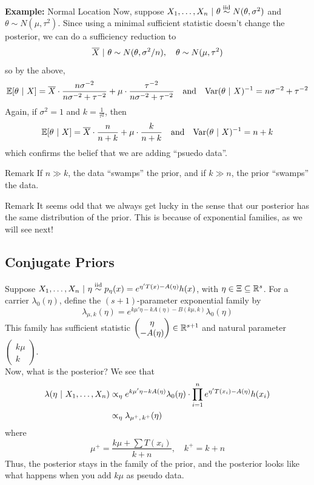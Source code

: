 \begin{example}{\textbf{Example:} Normal Location}
    Now, suppose $X_1, \ldots, X_n \ |\  \theta \overset{\text{iid}}{\sim} N(\theta, \sigma^2)$ and $\theta \sim N(\mu, \tau^2)$. Since using a minimal sufficient statistic doesn't change the posterior, we can do a sufficiency reduction to
    \[ \overline{X} \ |\  \theta \sim N(\theta, \sigma^2/n), \quad \theta \sim N(\mu, \tau^2) \]
    so by the above,
    \[ \mathbb{E}[\theta \ |\  X] = \overline{X} \cdot \frac{n\sigma^{-2}}{n\sigma^{-2} + \tau^{-2}} + \mu \cdot \frac{\tau^{-2}}{n\sigma^{-2} + \tau^{-2}} \quad \text{and} \quad \text{Var}(\theta \ |\  X)^{-1} = n\sigma^{-2} + \tau^{-2} \]
    Again, if $\sigma^2 = 1$ and $k = \frac{1}{\tau^2}$, then
    \[ \mathbb{E}[\theta \ |\  X] = \overline{X} \cdot \frac{n}{n + k} + \mu \cdot \frac{k}{n + k} \quad \text{and} \quad \text{Var}(\theta \ |\  X)^{-1} = n + k \]
    which confirms the belief that we are adding ``psuedo data''.
\end{example}

\begin{remark}{Remark}
    If $n \gg k$, the data ``swamps'' the prior, and if $k \gg n$, the prior ``swamps'' the data.
\end{remark}

\begin{remark}{Remark}
    It seems odd that we always get lucky in the sense that our posterior has the same distribution of the prior. This is because of exponential families, as we will see next!
\end{remark}

\subsection*{Conjugate Priors}
\sectionspace

Suppose $X_1, \ldots, X_n \ |\  \eta \overset{\text{iid}}{\sim} p_{\eta}(x) = e^{\eta'T(x) - A(\eta)}h(x)$, with $\eta \in \Xi \subseteq \mathbb{R}^s$. For a carrier $\lambda_0(\eta)$, define the $(s + 1)$-parameter exponential family by
\[ \lambda_{\mu, k}(\eta) = e^{k\mu'\eta - kA(\eta) - B(k\mu, k)}\lambda_0(\eta) \]
This family has sufficient statistic $\begin{pmatrix} \eta \\ -A(\eta) \end{pmatrix} \in \mathbb{R}^{s + 1}$ and natural parameter $\begin{pmatrix} k\mu \\ k \end{pmatrix}$.\\

Now, what is the posterior? We see that
\begin{align*}
    \lambda(\eta \ |\  X_1, \ldots, X_n) &\propto_{\eta} e^{k\mu'\eta - kA(\eta)}\lambda_0(\eta) \cdot \prod_{i = 1}^{n} e^{\eta'T(x_i) - A(\eta)}h(x_i)\\
    &\propto_{\eta} \lambda_{\mu^{+},\, k^{+}}(\eta)
\end{align*}
where
\[ \mu^{+} = \frac{k\mu + \sum T(x_i)}{k + n}, \quad k^{+} = k + n \]
Thus, the posterior stays in the family of the prior, and the posterior looks like what happens when you add $k\mu$ as pseudo data. 

